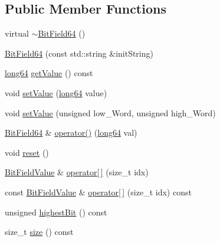 \subsection*{Public Member Functions}
\begin{DoxyCompactItemize}
\item 
virtual \hyperlink{class_d_d4hep_1_1_d_d_segmentation_1_1_bit_field64_a8a82f357f0409ed81727b4de29590b95}{$\sim$BitField64} ()
\item 
\hyperlink{class_d_d4hep_1_1_d_d_segmentation_1_1_bit_field64_aa958402b4d1f8d79cf716397b9b642e4}{BitField64} (const std::string \&initString)
\item 
\hyperlink{namespace_d_d4hep_ac2a70e722b33dc7ddaa20db8954ac836}{long64} \hyperlink{class_d_d4hep_1_1_d_d_segmentation_1_1_bit_field64_a5a16525cfe7ce38157d40f1300f33934}{getValue} () const 
\item 
void \hyperlink{class_d_d4hep_1_1_d_d_segmentation_1_1_bit_field64_a525ef87b1f0e9ff00a072102ac2f9457}{setValue} (\hyperlink{namespace_d_d4hep_ac2a70e722b33dc7ddaa20db8954ac836}{long64} value)
\item 
void \hyperlink{class_d_d4hep_1_1_d_d_segmentation_1_1_bit_field64_a0419ced4361da328259e8c71bdd28671}{setValue} (unsigned low\_\-Word, unsigned high\_\-Word)
\item 
\hyperlink{class_d_d4hep_1_1_d_d_segmentation_1_1_bit_field64}{BitField64} \& \hyperlink{class_d_d4hep_1_1_d_d_segmentation_1_1_bit_field64_af77a45d60bd3947bbfcd7822b06cbc9f}{operator()} (\hyperlink{namespace_d_d4hep_ac2a70e722b33dc7ddaa20db8954ac836}{long64} val)
\item 
void \hyperlink{class_d_d4hep_1_1_d_d_segmentation_1_1_bit_field64_af9f7362c6d23d8cce8669f8611def7e5}{reset} ()
\item 
\hyperlink{class_d_d4hep_1_1_d_d_segmentation_1_1_bit_field_value}{BitFieldValue} \& \hyperlink{class_d_d4hep_1_1_d_d_segmentation_1_1_bit_field64_aa04125e96306ce31f9aa042c4123c315}{operator\mbox{[}$\,$\mbox{]}} (size\_\-t idx)
\item 
const \hyperlink{class_d_d4hep_1_1_d_d_segmentation_1_1_bit_field_value}{BitFieldValue} \& \hyperlink{class_d_d4hep_1_1_d_d_segmentation_1_1_bit_field64_aac8290154832409c97ccb6dc7c7049e6}{operator\mbox{[}$\,$\mbox{]}} (size\_\-t idx) const 
\item 
unsigned \hyperlink{class_d_d4hep_1_1_d_d_segmentation_1_1_bit_field64_a6334ae7e469bd852eb9a96e597dd2e9e}{highestBit} () const 
\item 
size\_\-t \hyperlink{class_d_d4hep_1_1_d_d_segmentation_1_1_bit_field64_aff3b68ab610a6667f4240ddba2f4b728}{size} () const 

\end{DoxyCompactItemize}
